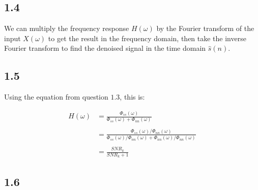 \documentclass[12pt]{article}
\begin{document}
\subsection*{1.4}

We can multiply the frequency response $H(\omega)$ by the Fourier transform of the input $X(\omega)$ to get the result in the frequency domain, then take the inverse Fourier transform to find the denoised signal in the time domain $\hat{s}(n)$.

\subsection*{1.5}
Using the equation from question $1.3$, this is:

\begin{align*}
H(\omega) &= \frac{\Phi_{ss}(\omega)}
{\Phi_{ss}(\omega) + \Phi_{nn}(\omega)} \\ \\
&= \frac{\Phi_{ss}(\omega) / \Phi_{nn}(\omega)}
{\Phi_{ss}(\omega) / \Phi_{nn}(\omega) + \Phi_{nn}(\omega) / \Phi_{nn}(\omega)} \\ \\
&= \frac{SNR_k}{SNR_k + 1}
\end{align*}

\subsection*{1.6}
\end{document}
